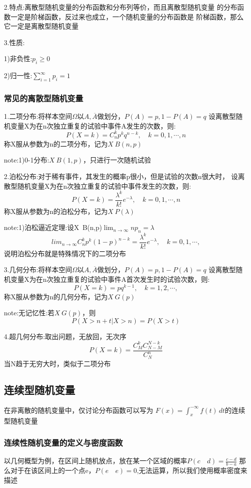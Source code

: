 \documentclass[11pt,twoside,a4paper]{ctexart}
\begin{document}
    2.特点:离散型随机变量的分布函数和分布列等价，而且离散型随机变量
    的分布函数一定是阶梯函数，反过来也成立，一个随机变量的分布函数是
    阶梯函数，那么它一定是离散型随机变量

    3.性质:
    \begin{minipage}[t]{0.9\linewidth}
        1)非负性:$p_i \geq 0 $

        2)归一性:$\sum_{i=1}^\infty p_i = 1 $

    \end{minipage}

    \subsubsection{常见的离散型随机变量}
    1.二项分布:将样本空间$\varOmega  $以$A,\overline{A} $做划分，$P(A) = p,1 - P(A) = q $
    设离散型随机变量X为在n次独立重复的试验中事件A发生的次数，则:
    \[P(X = k) = C_n^kp^kq^{n-k},\quad k = 0,1,\cdots,n \]
    称X服从参数为n的二项分布，记为$X~B(n,p) $

    note:1)0-1分布:$X~B(1,p) $，只进行一次随机试验

    2.泊松分布:对于稀有事件，其发生的概率p很小，但是试验的次数n很大时，
    设离散型随机变量X为在n次独立重复的试验中事件发生的次数，则:
    \[P(X = k) = \frac{\lambda ^k}{k!}e^{-\lambda },\quad k = 0,1,\cdots,n  \]
    称X服从参数为n的泊松分布，记为$X~P(\lambda ) $

    note:1)泊松逼近定理:设X~B(n,p)$\lim_{n \to \infty}np_n =\lambda  $  
    \[lim_{n \to \infty}C_n^kp^k(1-p)^{n-k} = \frac{\lambda ^k}{k!}e^{-\lambda } ,\quad k = 0,1,\cdots,\] 
    说明泊松分布就是特殊情况下的二项分布

    3.几何分布:将样本空间$\varOmega  $以$A,\overline{A} $做划分，$P(A) = p,1 - P(A) = q $
    设离散型随机变量X为在n次独立重复的试验中事件A首次发生时的试验次数，则:
    \[P(X = k) = pq^{k-1},\quad k = 1,2,\cdots, \]
    称X服从参数为n的几何分布，记为$X~G(p) $

    note:无记忆性:若$X~G(p) $，则
    \[P(X > n+ t|X > n) = P(X > t) \]

    4.超几何分布:取出问题，无放回，无次序
    \[P(X = k) = \frac{C_M^kC_{N-M}^{N-k}}{C_N^n} \]
    当N趋于无穷大时，类似于二项分布
    \subsection{连续型随机变量}
    在非离散的随机变量中，仅讨论分布函数可以写为
    $F(x) = \int_{x}^{-\infty}f(t)  \,dt  $的连续型随机变量
    \subsubsection{连续性随机变量的定义与密度函数}
    以几何概型为例，在区间上随机放点，放在某一个区域的概率$P(c\quad d) = \frac{c - d}{b - a} $
    那么对于在该区间上的一个点e，$P(e\quad e) = 0 $,无法运算，所以我们使用概率密度来描述
\end{document}
